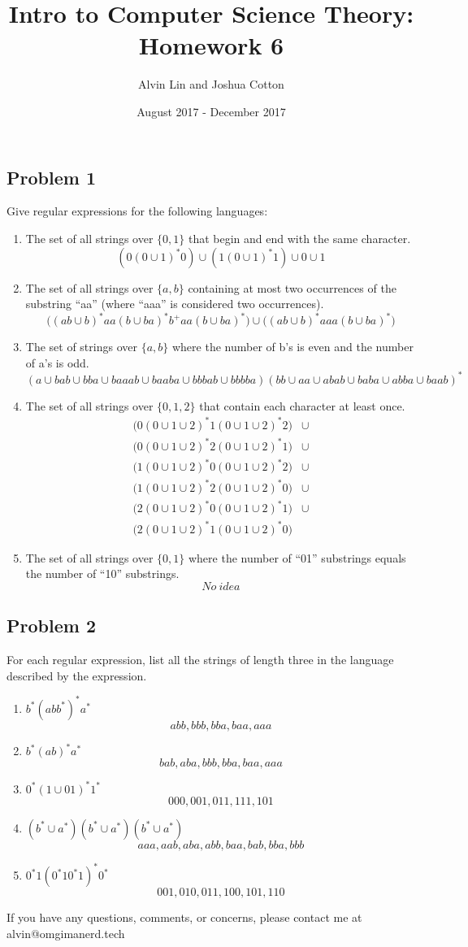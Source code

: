 \documentclass[letterpaper, 12pt]{math}
\title{Intro to Computer Science Theory: Homework 6}
\author{Alvin Lin and Joshua Cotton}
\date{August 2017 - December 2017}
\begin{document}
\maketitle

\subsection*{Problem 1}
Give regular expressions for the following languages:
\begin{enumerate}
  \item The set of all strings over \( \{0,1\} \) that begin and end with the
  same character.
  \[ (0(0\cup1)^*0)\cup(1(0\cup1)^*1)\cup0\cup1 \]
  \item The set of all strings over \( \{a,b\} \) containing at most two
  occurrences of the substring ``aa'' (where ``aaa'' is considered two
  occurrences).
  \[ \bigg((ab\cup b)^*aa(b\cup ba)^*b^+aa(b\cup ba)^*\bigg)\cup
    \bigg((ab\cup b)^*aaa(b\cup ba)^*\bigg) \]
  \item The set of strings over \( \{a,b\} \) where the number of b's is even
  and the number of a's is odd.
  \[ (a\cup bab\cup bba\cup baaab\cup baaba\cup bbbab\cup bbbba)
    (bb\cup aa\cup abab\cup baba\cup abba\cup baab)^* \]
  \item The set of all strings over \( \{0,1,2\} \) that contain each character
  at least once.
  \begin{align*}
    \bigg(0(0\cup1\cup2)^*1(0\cup1\cup2)^*2\bigg) &\cup \\
    \bigg(0(0\cup1\cup2)^*2(0\cup1\cup2)^*1\bigg) &\cup \\
    \bigg(1(0\cup1\cup2)^*0(0\cup1\cup2)^*2\bigg) &\cup \\
    \bigg(1(0\cup1\cup2)^*2(0\cup1\cup2)^*0\bigg) &\cup \\
    \bigg(2(0\cup1\cup2)^*0(0\cup1\cup2)^*1\bigg) &\cup \\
    \bigg(2(0\cup1\cup2)^*1(0\cup1\cup2)^*0\bigg)
  \end{align*}
  \item The set of all strings over \( \{0,1\} \) where the number of ``01''
  substrings equals the number of ``10'' substrings.
  \[ No~idea \]
\end{enumerate}

\subsection*{Problem 2}
For each regular expression, list all the strings of length three in the
language described by the expression.
\begin{enumerate}
  \item \( b^*(abb^*)^*a^* \)
  \[ abb, bbb, bba, baa, aaa \]
  \item \( b^*(ab)^*a^* \)
  \[ bab, aba, bbb, bba, baa, aaa \]
  \item \( 0^*(1\cup01)^*1^* \)
  \[ 000, 001, 011, 111, 101 \]
  \item \( (b^*\cup a^*)(b^*\cup a^*)(b^*\cup a^*) \)
  \[ aaa, aab, aba, abb, baa, bab, bba, bbb \]
  \item \( 0^*1(0^*10^*1)^*0^* \)
  \[ 001, 010, 011, 100, 101, 110 \]
\end{enumerate}

\begin{center}
  If you have any questions, comments, or concerns, please contact me at
  alvin@omgimanerd.tech
\end{center}
\end{document}
